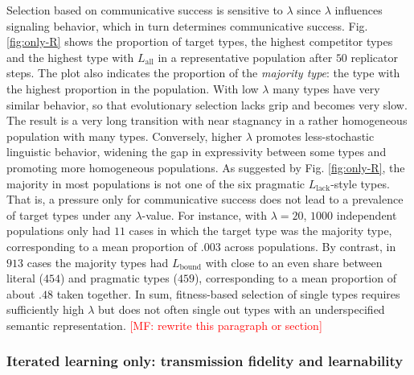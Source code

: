 \documentclass[a4paper, 11pt]{article}
\theoremstyle{Satz}
\newcommand{\mf}[1]{\textcolor{Red}{[MF: #1]}}
\newcommand{\mylang}[1]{\ensuremath{L_{\text{#1}}}\xspace} %
\newcommand{\Lall}{\mylang{all}}
\newcommand{\Lbound}{\mylang{bound}}
\newcommand{\Llack}{\mylang{lack}}
\begin{document}
Selection based on communicative success is sensitive to $\lambda$ since $\lambda$ influences
signaling behavior, which in turn determines communicative success. Fig. \ref{fig:only-R} shows
the proportion of target types, the highest competitor types and the highest type with $\Lall$
in a representative population after $50$ replicator steps. The plot also indicates the
proportion of the \emph{majority type}: the type with the highest proportion in the
population. With low $\lambda$ many types have very similar behavior, so that evolutionary
selection lacks grip and becomes very slow. The result is a very long transition with near
stagnancy in a rather homogeneous population with many types. Conversely, higher $\lambda$
promotes less-stochastic linguistic behavior, widening the gap in expressivity between some
types and promoting more homogeneous populations. As suggested by Fig. \ref{fig:only-R}, the
majority in most populations is not one of the six pragmatic $\Llack$-style types. That is, a
pressure only for communicative success does not lead to a prevalence of target types under any
$\lambda$-value. For instance, with $\lambda = 20$, $1000$ independent populations only had $11$
cases in which the target type was the majority type, corresponding to a mean proportion of
$.003$ across populations. By contrast, in $913$ cases the majority types had $\Lbound$ with
close to an even share between literal ($454$) and pragmatic types ($459$), corresponding to a
mean proportion of about $.48$ taken together. In sum, fitness-based selection of single types
requires sufficiently high $\lambda$ but does not often single out types with an underspecified
semantic representation. \mf{rewrite this paragraph or section}


\subsubsection{Iterated learning only: transmission fidelity and learnability}
\end{document}
